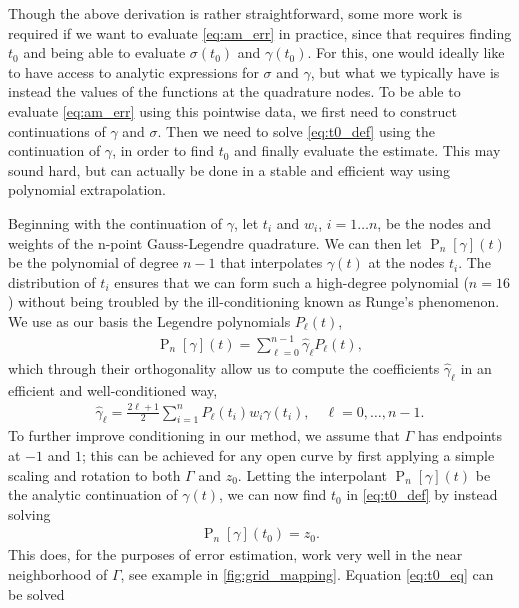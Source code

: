 \documentclass[hidelinks]{siamart1116}
\begin{document}
Though the above derivation is rather straightforward, some more work
is required if we want to evaluate \eqref{eq:am_err} in practice,
since that requires finding $t_0$ and being able to evaluate
${{\sigma}}(t_0)$ and ${\gamma}(t_0)$. For this, one would ideally like
to have access to analytic expressions for ${\sigma}$ and ${\gamma}$, but
what we typically have is instead the values of the functions at the
quadrature nodes. To be able to evaluate \eqref{eq:am_err} using this
pointwise data, we first need to construct continuations of ${\gamma}$
and ${{\sigma}}$. Then we need to solve \eqref{eq:t0_def} using the
continuation of ${\gamma}$, in order to find $t_0$ and finally evaluate
the estimate. This may sound hard, but can actually be done in a
stable and efficient way using polynomial extrapolation.

Beginning with the continuation of ${\gamma}$, let $t_i$ and $w_i$,
$i=1 \dots n$, be the nodes and weights of the n-point Gauss-Legendre
quadrature. We can then let ${\operatorname{P}}_n[\gamma](t)$ be the polynomial of
degree $n-1$ that interpolates $\gamma(t)$ at the nodes $t_i$. The
distribution of $t_i$ ensures that we can form such a high-degree
polynomial ($n=16$) without being troubled by the ill-conditioning
known as Runge's phenomenon. We use as our basis the Legendre
polynomials $P_\ell(t)$,
\begin{align}
  {\operatorname{P}}_n[\gamma](t) = \sum_{\ell=0}^{n-1} \hat\gamma_\ell P_\ell(t), 
\end{align}
which through their orthogonality allow us to compute the
coefficients $\hat\gamma_\ell$ in an efficient and well-conditioned way,
\begin{align}
  \hat\gamma_\ell = \frac{2\ell+1}{2} \sum_{i=1}^n P_\ell(t_i) w_i \gamma(t_i),
  \quad
  \ell=0, \dots, n-1 .
\end{align}
To further improve conditioning in our method, we assume that $\Gamma$
has endpoints at $-1$ and $1$; this can be achieved for any open curve
by first applying a simple scaling and rotation to both $\Gamma$ and
$z_0$. Letting the interpolant ${\operatorname{P}}_n[\gamma](t)$ be the analytic
continuation of $\gamma(t)$, we can now find $t_0$ in
\eqref{eq:t0_def} by instead solving
\begin{align}
  {\operatorname{P}}_n[\gamma](t_0) = z_0 .
  \label{eq:t0_eq}
\end{align}
This does, for the purposes of error estimation, work very well in the
near neighborhood of $\Gamma$, see example in
\cref{fig:grid_mapping}. Equation \eqref{eq:t0_eq} can be solved
\end{document}

